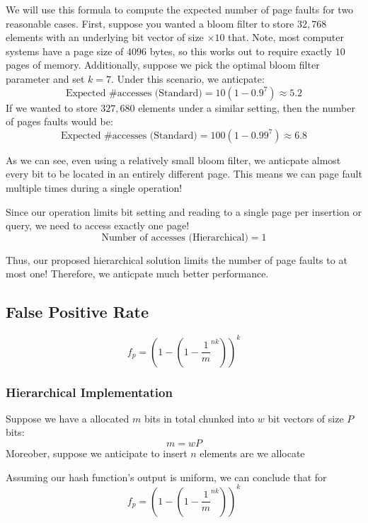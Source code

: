 We will use this formula to compute the expected number of page faults for two reasonable cases.
First, suppose you wanted a bloom filter to store $32,768$ elements with an underlying bit vector of size $\times 10$ that.
Note, most computer systems have a page size of $4096$ bytes, so this works out to require exactly $10$ pages of memory.
Additionally, suppose we pick the optimal bloom filter parameter and set $k=7$.
Under this scenario, we anticpate:
$$\text{Expected \# accesses (Standard)} = 10(1-0.9^7) \approx 5.2$$
If we wanted to store $327,680$ elements under a similar setting, then the number of pages faults would be:
$$\text{Expected \# accesses (Standard)} = 100(1-0.99^7) \approx 6.8$$

As we can see, even using a relatively small bloom filter, we anticpate almost every bit to be located in an entirely different page.
This means we can page fault multiple times during a single operation!

Since our operation limits bit setting and reading to a single page per insertion or query, we need to access exactly one page!
$$\text{Number of accesses (Hierarchical)} = 1$$

Thus, our proposed hierarchical solution limits the number of page faults to at most one!
Therefore, we anticpate much better performance.
\subsection{False Positive Rate}

\begin{equation}
    f_p = (1 - (1 - \frac{1}{m}^{nk}))^k
\end{equation}




\subsubsection{Hierarchical Implementation}

Suppose we have a allocated $m$ bits in total chunked into $w$ bit vectors of size $P$ bits:
$$ m = wP$$
Moreober, suppose we anticipate to insert $n$ elements are we allocate


Assuming our hash function's output is uniform, we can conclude that for
\begin{equation}
    f_p = (1 - (1 - \frac{1}{m}^{nk}))^k
\end{equation}